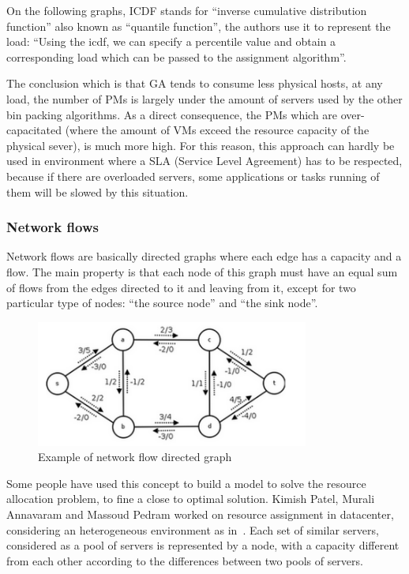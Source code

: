 On the following graphs, ICDF stands for “inverse cumulative distribution
function” also known as “quantile function”, the authors use it to represent
the load: “Using the icdf, we can specify a percentile value and obtain a
corresponding load which can be passed to the assignment algorithm”.

The conclusion which is that GA tends to consume less physical hosts, at any
load, the number of PMs is largely under the amount of servers used by the
other bin packing algorithms. As a direct consequence, the PMs which are
over-capacitated (where the amount of VMs exceed the resource capacity of the
physical sever), is much more high. For this reason, this approach can hardly
be used in environment where a SLA (Service Level Agreement) has to be
respected, because if there are overloaded servers, some applications or tasks
running of them will be slowed by this situation.

\subsubsection{Network flows}

Network flows are basically directed graphs where each edge has a capacity and a flow.
The main property is that each node of this graph must have an equal sum of flows from
the edges directed to it and leaving from it, except for two particular type of nodes:
“the source node” and “the sink node”.

\begin{figure}[H]
\begin{center}
	\includegraphics[width=0.8\textwidth]{./Images/examplenetwork.png}
	\caption{Example of network flow directed graph}
\end{center}
\end{figure}

Some people have used this concept to build a model to solve the resource
allocation problem, to fine a close to optimal solution. Kimish Patel, Murali
Annavaram and Massoud Pedram worked on resource assignment in
datacenter\cite{allocationNetworkflow}, considering an heterogeneous
environment as in~\cite{allocationHeterogeneous}. Each set of similar servers,
considered as a pool of servers is represented by a node, with a capacity
different from each other according to the differences between two pools of
servers.

